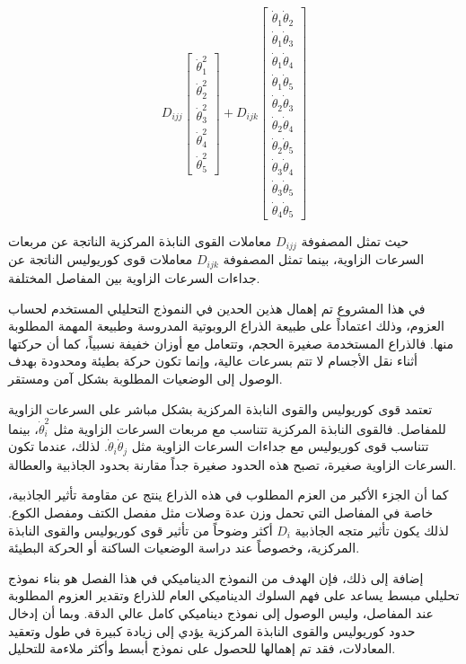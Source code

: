 \[
D_{ijj}
\begin{bmatrix}
\dot{\theta}_1^2 \\
\dot{\theta}_2^2 \\
\dot{\theta}_3^2 \\
\dot{\theta}_4^2 \\
\dot{\theta}_5^2
\end{bmatrix}
+
D_{ijk}
\begin{bmatrix}
\dot{\theta}_1\dot{\theta}_2 \\
\dot{\theta}_1\dot{\theta}_3 \\
\dot{\theta}_1\dot{\theta}_4 \\
\dot{\theta}_1\dot{\theta}_5 \\
\dot{\theta}_2\dot{\theta}_3 \\
\dot{\theta}_2\dot{\theta}_4 \\
\dot{\theta}_2\dot{\theta}_5 \\
\dot{\theta}_3\dot{\theta}_4 \\
\dot{\theta}_3\dot{\theta}_5 \\
\dot{\theta}_4\dot{\theta}_5
\end{bmatrix}
\]

حيث تمثل المصفوفة $D_{ijj}$ معاملات القوى النابذة المركزية الناتجة عن مربعات السرعات الزاوية، بينما تمثل المصفوفة $D_{ijk}$ معاملات قوى كوريوليس الناتجة عن جداءات السرعات الزاوية بين المفاصل المختلفة.

في هذا المشروع تم إهمال هذين الحدين في النموذج التحليلي المستخدم لحساب العزوم، وذلك اعتماداً على طبيعة الذراع الروبوتية المدروسة وطبيعة المهمة المطلوبة منها. فالذراع المستخدمة صغيرة الحجم، وتتعامل مع أوزان خفيفة نسبياً، كما أن حركتها أثناء نقل الأجسام لا تتم بسرعات عالية، وإنما تكون حركة بطيئة ومحدودة بهدف الوصول إلى الوضعيات المطلوبة بشكل آمن ومستقر.

تعتمد قوى كوريوليس والقوى النابذة المركزية بشكل مباشر على السرعات الزاوية للمفاصل. فالقوى النابذة المركزية تتناسب مع مربعات السرعات الزاوية مثل $\dot{\theta}_i^2$، بينما تتناسب قوى كوريوليس مع جداءات السرعات الزاوية مثل $\dot{\theta}_i\dot{\theta}_j$. لذلك، عندما تكون السرعات الزاوية صغيرة، تصبح هذه الحدود صغيرة جداً مقارنة بحدود الجاذبية والعطالة.

كما أن الجزء الأكبر من العزم المطلوب في هذه الذراع ينتج عن مقاومة تأثير الجاذبية، خاصة في المفاصل التي تحمل وزن عدة وصلات مثل مفصل الكتف ومفصل الكوع. لذلك يكون تأثير متجه الجاذبية $D_i$ أكثر وضوحاً من تأثير قوى كوريوليس والقوى النابذة المركزية، وخصوصاً عند دراسة الوضعيات الساكنة أو الحركة البطيئة.

إضافة إلى ذلك، فإن الهدف من النموذج الديناميكي في هذا الفصل هو بناء نموذج تحليلي مبسط يساعد على فهم السلوك الديناميكي العام للذراع وتقدير العزوم المطلوبة عند المفاصل، وليس الوصول إلى نموذج ديناميكي كامل عالي الدقة. وبما أن إدخال حدود كوريوليس والقوى النابذة المركزية يؤدي إلى زيادة كبيرة في طول وتعقيد المعادلات، فقد تم إهمالها للحصول على نموذج أبسط وأكثر ملاءمة للتحليل.

